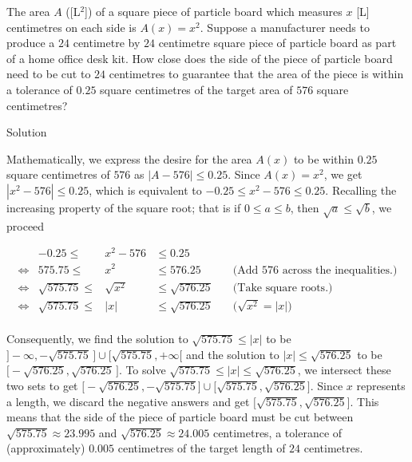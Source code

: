 \begin{example} 
The area $A$ ([L$^2$]) of a square piece of particle board which measures $x$ [L] centimetres on each side is $A(x) = x^2$.  Suppose a manufacturer needs to produce a $24$ centimetre by $24$ centimetre square piece of particle board as part of a home office desk kit. How close does the side of the piece of particle board need to be cut to $24$ centimetres to guarantee that the area of the piece is within a tolerance of $0.25$ square centimetres of the target area of $576$ square centimetres?  

Solution 

 Mathematically, we express the desire for the area $A(x)$ to be within $0.25$ square centimetres of $576$ as $|A - 576| \leq 0.25$.  Since $A(x) = x^2$, we get $|x^2 - 576| \leq 0.25$, which is equivalent to $-0.25 \leq x^2 - 576 \leq 0.25$.  Recalling the increasing property of the square root; that is  if $0 \leq a \leq b$, then $\sqrt{a} \leq \sqrt{b}$, we proceed

\[ \begin{array}{rrclr}

&-0.25  \leq & x^2 - 576 & \leq 0.25 & \\
\Leftrightarrow&575.75 \leq & x^2 & \leq 576.25 & \quad\text{(Add $576$ across the inequalities.)} \\
\Leftrightarrow&\sqrt{575.75} \leq & \sqrt{x^2} & \leq \sqrt{576.25} & \quad\text{(Take square roots.)} \\
\Leftrightarrow&\sqrt{575.75} \leq & |x| & \leq \sqrt{576.25} & \quad\text{($\sqrt{x^2} = |x|$)} \\ \end{array} \]



Consequently, we find the solution to $\sqrt{575.75} \leq |x|$ to be $\big]-\infty, -\sqrt{575.75} \, \big] \cup \big[\sqrt{575.75}, +\infty \big[$ and the solution to $|x| \leq \sqrt{576.25}$ to be  $\big[-\sqrt{576.25}, \sqrt{576.25} \, \big]$. To solve $\sqrt{575.75} \leq  |x|  \leq \sqrt{576.25}$, we intersect these two sets to get $\big[-\sqrt{576.25}, -\sqrt{575.75}\big] \cup \big[\sqrt{575.75},\sqrt{576.25}\big]$.  Since $x$ represents a length, we discard the negative answers and get $\big[\sqrt{575.75},\sqrt{576.25}\big]$.  This means that the side of the piece of particle board must be cut between $\sqrt{575.75} \approx 23.995$ and $\sqrt{576.25} \approx 24.005$ centimetres, a tolerance of (approximately) $0.005$ centimetres of the target length of $24$ centimetres. 

\end{example}


